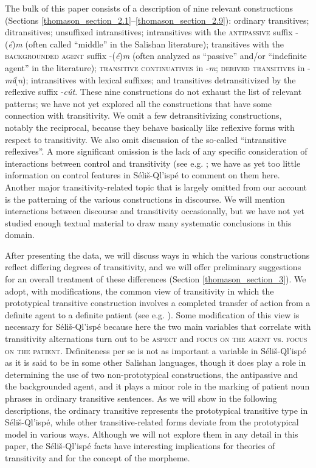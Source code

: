 \documentclass[output=paper,colorlinks,citecolor=brown]{langscibook}
\begin{document}
  The bulk of this paper consists of a description of nine relevant
  constructions (Sections \ref{thomason_section_2.1}--\ref{thomason_section_2.9}): ordinary transitives; ditransitives;
  unsuffixed intransitives; intransitives with the
  \textsc{antipassive} suffix -(\emph{\'e})\emph{m} (often called
  ``middle'' in the Salishan literature); transitives with the
  \textsc{backgrounded agent} suffix -(\emph{\'e})\emph{m} (often
  analyzed as ``passive'' and/or ``indefinite agent'' in the
  literature); \textsc{transitive continuatives} in -\emph{m};
  \textsc{derived transitives} in -\emph{m\'i}(\emph{n});
  intransitives with lexical suffixes; and transitives
  detransitivized by the reflexive suffix -\emph{c\'ut}.  These nine
  constructions do not exhaust the list of relevant patterns; we have
  not yet explored all the constructions that have some connection
  with transitivity.  We omit a few detransitivizing constructions,
  notably the reciprocal, because they behave basically like
  reflexive forms with respect to transitivity.  We also omit
  discussion of the so-called ``intransitive reflexives''.  A more
  significant omission is the lack of any specific consideration of
  interactions between control and transitivity (see
  e.g. \citealt{Thompson:1985}; we have as yet too little information
  on control features in S\'eli\v{s}-Ql'isp\'e to comment on them
  here.  Another major transitivity-related topic that is largely
  omitted from our account is the patterning of the various
  constructions in discourse.  We will mention interactions between
  discourse and transitivity occasionally, but we have not yet
  studied enough textual material to draw many systematic conclusions
  in this domain.


  After presenting the data, we will discuss ways in which the
  various constructions reflect differing degrees of transitivity,
  and we will offer preliminary suggestions for an overall treatment
  of these differences (Section \ref{thomason_section_3}).  We adopt, with modifications, the
  common view of transitivity in which the prototypical transitive
  construction involves a completed transfer of action from a
  definite agent to a definite patient (see
  e.g. \citealt{Hopper&Thompson:1980}).  Some modification of this view is
  necessary for
  S\'eli\v{s}-Ql'isp\'e because here the two main variables that
  correlate with transitivity alternations turn out to be \textsc{aspect} and \textsc{focus on the agent} vs. \textsc{focus on the
    patient}.  Definiteness per se is not as important a variable in
  S\'eli\v{s}-Ql'isp\'e as it is said to be in some other Salishan
  languages, though it does play a role in determining the use of two
  non-prototypical constructions, the antipassive and the
  backgrounded agent, and it plays a minor role in the marking of
  patient noun phrases in ordinary transitive sentences.  As we will
  show in the following descriptions, the ordinary transitive
  represents the prototypical transitive type in
  S\'eli\v{s}-Ql'isp\'e, while other transitive-related forms deviate
  from the prototypical model in various ways.  Although we will not
  explore them in any detail in this paper, the S\'eli\v{s}-Ql'isp\'e
  facts have interesting implications for theories of transitivity
  and for the concept of the morpheme.
\end{document}

